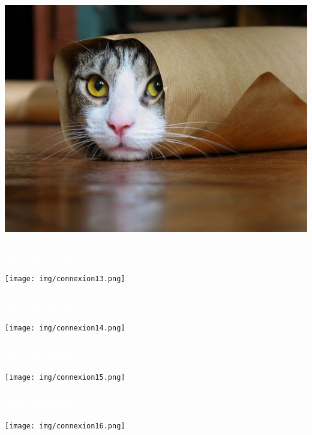 \documentclass[notes=hide]{beamer}
\begin{document}
\begin{frame}[t,plain]
\begin{center}
  \vspace{\fill}
  \includegraphics[width=\textwidth]{img/internet-cat.jpg}
  \vspace{\fill}
\end{center}
\end{frame}
\begin{frame}[t]
\frametitle{\textcolor{white}{Avec la Brique}}
  \begin{center}
  \texttt{[image: img/connexion13.png]}
  \end{center}
\end{frame}
\begin{frame}[t]
\frametitle{\textcolor{white}{Avec la Brique}}
  \begin{center}
  \texttt{[image: img/connexion14.png]}
  \end{center}
\end{frame}

\begin{frame}[t]
  \frametitle{\textcolor{white}{Avec la Brique}}
  \begin{center}
  \texttt{[image: img/connexion15.png]}
  \end{center}
\end{frame}

\begin{frame}[t]
  \frametitle{\textcolor{white}{Avec la Brique}}
  \begin{center}
  \texttt{[image: img/connexion16.png]}
  \end{center}
\end{frame}
\end{document}

